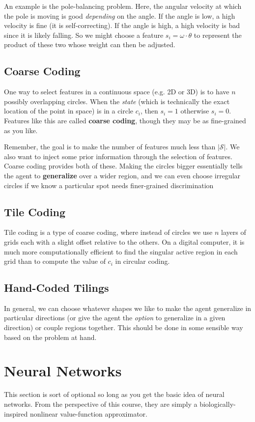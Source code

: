 \documentclass[11pt]{report}
\begin{document}
An example is the pole-balancing problem. Here, the angular velocity at which the pole is moving is good \textit{depending} on the angle. If the angle is low, a high velocity is fine (it is self-correcting). If the angle is high, a high velocity is bad since it is likely falling. So we might choose a feature $s_i = \omega \cdot \theta$ to represent the product of these two whose weight can then be adjusted.

\subsection{Coarse Coding}
One way to select features in a continuous space (e.g. 2D or 3D) is to have $n$ possibly overlapping circles. When the \textit{state} (which is technically the exact location of the point in space) is in a circle $c_i$, then $s_i = 1$ otherwise $s_i = 0$. Features like this are called \textbf{coarse coding}, though they may be as fine-grained as you like.

Remember, the goal is to make the number of features much less than $|\mathcal{S}|$. We also want to inject some prior information through the selection of features. Coarse coding provides both of these. Making the circles bigger essentially tells the agent to \textbf{generalize} over a wider region, and we can even choose irregular circles if we know a particular spot needs finer-grained discrimination

\subsection{Tile Coding}
Tile coding is a type of coarse coding, where instead of circles we use $n$ layers of grids each with a slight offset relative to the others. On a digital computer, it is much more computationally efficient to find the singular active region in each grid than to compute the value of $c_i$ in circular coding.

\subsection{Hand-Coded Tilings}
In general, we can choose whatever shapes we like to make the agent generalize in particular directions (or give the agent the \textit{option} to generalize in a given direction) or couple regions together. This should be done in some sensible way based on the problem at hand.


\section{Neural Networks}\label{sec:neural-networks}
This section is sort of optional so long as you get the basic idea of neural networks. From the perspective of this course, they are simply a biologically-inspired nonlinear value-function approximator.
\end{document}
